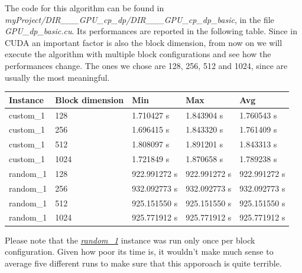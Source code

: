 \documentclass[12pt]{extarticle}
\begin{document}
The code for this algorithm can be found in \newline\emph{myProject/DIR\_\_\_GPU\_cp\_dp/DIR\_\_\_GPU\_cp\_dp\_basic}, in the file \emph{GPU\_dp\_basic.cu}.\newline
Its performances are reported in the following table. Since in CUDA an important factor is also the block dimension, from now on we will execute the algorithm with multiple block configurations and see how the performances change. The ones we chose are 128, 256, 512 and 1024, since are usually the most meaningful.
\begin{center}
\begin{tabular}{ | m{2.2cm} | m{3cm} | m{2.4cm} | m{2.4cm} | m{2.4cm} |}
 \hline
 Instance & Block dimension & Min & Max & Avg\\
 \hline
 custom\_1 & 128 & 1.710427 s & 1.843904 s & 1.760543 s\\
 \hline
 custom\_1 & 256 & 1.696415 s & 1.843320 s & 1.761409 s\\
 \hline
 custom\_1 & 512 & 1.808097 s & 1.891201 s & 1.843313 s\\
 \hline
 custom\_1 & 1024 & 1.721849 s & 1.870658 s & 1.789238 s\\
 \hline
 random\_1 & 128 & 922.991272 s & 922.991272 s & 922.991272 s\\
 \hline
 random\_1 & 256 & 932.092773 s & 932.092773 s & 932.092773 s\\
 \hline
 random\_1 & 512 & 925.151550 s & 925.151550 s & 925.151550 s\\
 \hline
 random\_1 & 1024 & 925.771912 s & 925.771912 s & 925.771912 s\\
 \hline
\end{tabular}
\end{center}
Please note that the \hyperref[random-1]{\emph{random\_1}} instance was run only once per block configuration. Given how poor its time is, it wouldn't make much sense to average five different runs to make sure that this apporoach is quite terrible.\newline
\end{document}
